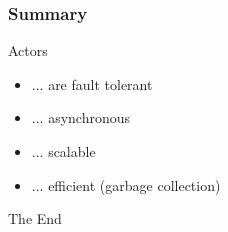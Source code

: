 \documentclass{beamer}
\begin{document}
\begin{frame}
\frametitle{Summary}
\Huge{Actors}
\Large
\begin{itemize}[<+->]
\item ... are fault tolerant
\item ... asynchronous
\item ... scalable
\item ... efficient (garbage collection)
\end{itemize}
\end{frame}


\begin{frame}
\Huge{\centerline{The End}}
\end{frame}

\end{document}

